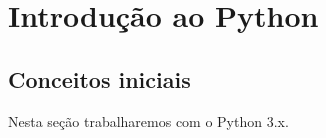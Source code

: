 
\chapter{Introdução ao Python}

\section{Conceitos iniciais}
Nesta seção trabalharemos com o Python 3.x.